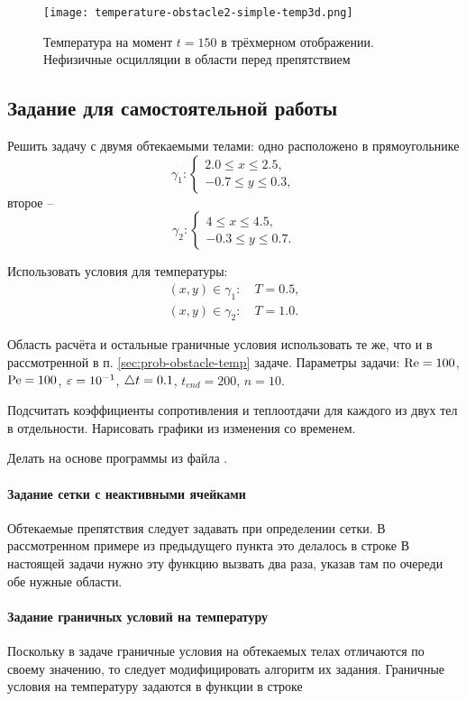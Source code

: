 \begin{figure}[h!]
\centering
\texttt{[image: temperature-obstacle2-simple-temp3d.png]}
\caption{Температура на момент $t=150$ в трёхмерном отображении. Нефизичные осцилляции в области перед препятствием}
\label{fig:temperature-obstacle2-simple-temp3d}
\end{figure}


\subsection{Задание для самостоятельной работы}
Решить задачу с двумя обтекаемыми телами: одно расположено
в прямоугольнике
$$
\gamma_1: \begin{cases}
2.0 \leq x \leq 2.5, \\
-0.7 \leq y \leq 0.3,
\end{cases}
$$
второе --
$$
\gamma_2: \begin{cases}
4 \leq x \leq 4.5, \\
-0.3 \leq y \leq 0.7.
\end{cases}
$$

Использовать условия для температуры:
\begin{align*}
(x, y) \in \gamma_1: \quad T=0.5,\\
(x, y) \in \gamma_2: \quad T=1.0.
\end{align*}

Область расчёта и остальные граничные условия использовать те же, что и
в рассмотренной в п. \ref{sec:prob-obstacle-temp} задаче.
Параметры задачи:
$\mathrm{Re} = 100$, $\mathrm{Pe} = 100$, $\varepsilon=10^{-1}$, $\triangle t = 0.1$, $t_{end} = 200$, $n=10$.

Подсчитать коэффициенты сопротивления и теплоотдачи для каждого из двух
тел в отдельности. Нарисовать графики из изменения со временем.

Делать на основе программы из файла .

\paragraph{Задание сетки с неактивными ячейками}
Обтекаемые препятствия следует задавать
при определении сетки. В рассмотренном примере из предыдущего пункта
это делалось в строке
В настоящей задачи нужно эту функцию вызвать два раза, указав там по очереди обе нужные области.

\paragraph{Задание граничных условий на температуру}
Поскольку в задаче граничные условия на обтекаемых
телах отличаются по своему значению, то следует
модифицировать алгоритм их задания.
Граничные условия на температуру задаются в функции 
в строке

